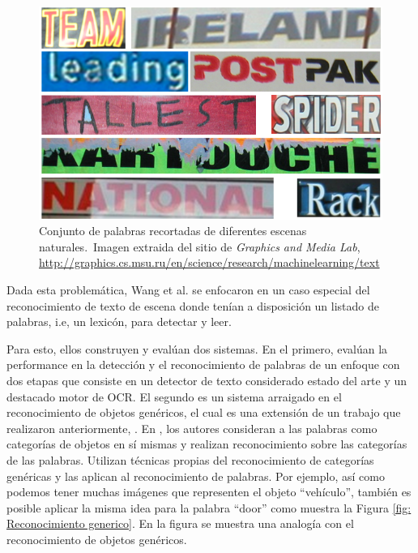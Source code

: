 \begin{itemize}
	\begin{figure}[htbp]
		\centering
		\centerline{ \includegraphics[scale=0.30]{img/cropped_words.png} }
		\caption[Reconocimiento de palabras recortadas]{Conjunto de palabras recortadas de diferentes escenas naturales.~Imagen extraida del sitio de \textit{Graphics and Media Lab}, \url{http://graphics.cs.msu.ru/en/science/research/machinelearning/text}}
		\label{fig: Reconocimiento palabras}
	\end{figure}
		
	\end{itemize}

	Dada esta problemática, Wang et al. se enfocaron en un caso especial del reconocimiento de texto de escena donde tenían a disposición un listado de palabras, i.e, un lexicón, para detectar y leer.
		
	Para esto, ellos construyen y evalúan dos sistemas. En el primero, evalúan la performance en la detección y el reconocimiento de palabras de un enfoque con dos etapas que consiste en un detector de texto considerado estado del arte y un destacado motor de OCR. El segundo es un sistema arraigado en el reconocimiento de objetos genéricos, el cual es una extensión de un trabajo que realizaron anteriormente, \cite{WB10}. En \cite{WB10}, los autores consideran a las palabras como categorías de objetos en sí mismas y realizan reconocimiento sobre las categorías de las palabras. Utilizan técnicas propias del reconocimiento de categorías genéricas y las aplican al reconocimiento de palabras. Por ejemplo, así como podemos tener muchas imágenes que representen el objeto ``vehículo'', también es posible aplicar la misma idea para la palabra ``door'' como muestra la Figura \ref{fig: Reconocimiento generico}. En la figura se muestra una analogía con el reconocimiento de objetos genéricos.
	
